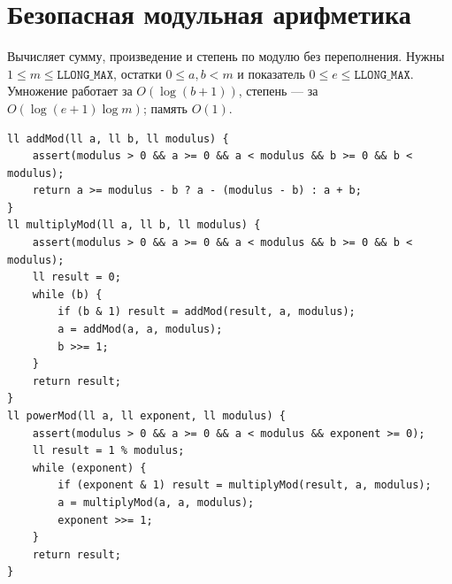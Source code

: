 \section{Безопасная модульная арифметика}
Вычисляет сумму, произведение и степень по модулю без переполнения.
Нужны $1\le m\le\texttt{LLONG\_MAX}$, остатки $0\le a,b<m$ и показатель $0\le e\le\texttt{LLONG\_MAX}$.
Умножение работает за $O(\log(b+1))$, степень --- за $O(\log(e+1)\log m)$; память $O(1)$.
\begin{lstlisting}[name=extra_math_mod]
ll addMod(ll a, ll b, ll modulus) {
    assert(modulus > 0 && a >= 0 && a < modulus && b >= 0 && b < modulus);
    return a >= modulus - b ? a - (modulus - b) : a + b;
}
ll multiplyMod(ll a, ll b, ll modulus) {
    assert(modulus > 0 && a >= 0 && a < modulus && b >= 0 && b < modulus);
    ll result = 0;
    while (b) {
        if (b & 1) result = addMod(result, a, modulus);
        a = addMod(a, a, modulus);
        b >>= 1;
    }
    return result;
}
ll powerMod(ll a, ll exponent, ll modulus) {
    assert(modulus > 0 && a >= 0 && a < modulus && exponent >= 0);
    ll result = 1 % modulus;
    while (exponent) {
        if (exponent & 1) result = multiplyMod(result, a, modulus);
        a = multiplyMod(a, a, modulus);
        exponent >>= 1;
    }
    return result;
}
\end{lstlisting}
%


